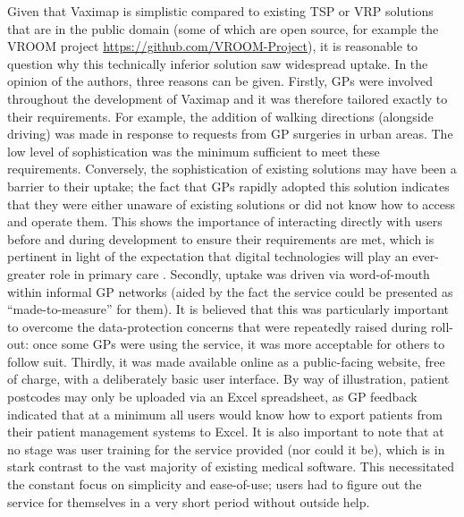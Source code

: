 \documentclass{article}
\def\vm{Vaximap}
\begin{document}
Given that \vm{} is simplistic compared to existing TSP or VRP solutions that are in the public domain (some of which are open source, for example the VROOM project \url{https://github.com/VROOM-Project}), it is reasonable to question why this technically inferior solution saw widespread uptake. In the opinion of the authors, three reasons can be given. Firstly, GPs were involved throughout the development of \vm{} and it was therefore tailored exactly to their requirements. For example, the addition of walking directions (alongside driving) was made in response to requests from GP surgeries in urban areas. The low level of sophistication was the minimum sufficient to meet these requirements. Conversely, the sophistication of existing solutions may have been a barrier to their uptake; the fact that GPs rapidly adopted this solution indicates that they were either unaware of existing solutions or did not know how to access and operate them. This shows the importance of interacting directly with users before and during development to ensure their requirements are met, which is pertinent in light of the expectation that digital technologies will play an ever-greater role in primary care \cite{WorldHealthOrganizationWHO2018}. Secondly, uptake was driven via word-of-mouth within informal GP networks (aided by the fact the service could be presented as ``made-to-measure'' for them). It is believed that this was particularly important to overcome the data-protection concerns that were repeatedly raised during roll-out: once some GPs were using the service, it was more acceptable for others to follow suit. Thirdly, it was made available online as a public-facing website, free of charge, with a deliberately basic user interface. By way of illustration, patient postcodes may only be uploaded via an Excel spreadsheet, as GP feedback indicated that at a minimum all users would know how to export patients from their patient management systems to Excel. It is also important to note that at no stage was user training for the service provided (nor could it be), which is in stark contrast to the vast majority of existing medical software. This necessitated the constant focus on simplicity and ease-of-use; users had to figure out the service for themselves in a very short period without outside help. 
\end{document}
